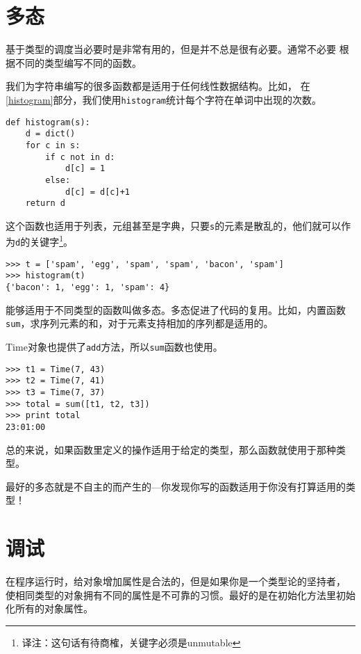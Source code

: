 \section{多态}

基于类型的调度当必要时是非常有用的，但是并不总是很有必要。通常不必要
根据不同的类型编写不同的函数。


我们为字符串编写的很多函数都是适用于任何线性数据结构。比如，
在\ref{histogram}部分，我们使用{\tt histogram}统计每个字符在单词中出现的次数。

\beforeverb
\begin{verbatim}
def histogram(s):
    d = dict()
    for c in s:
        if c not in d:
            d[c] = 1
        else:
            d[c] = d[c]+1
    return d
\end{verbatim}
\afterverb

这个函数也适用于列表，元组甚至是字典，只要{\tt s}的元素是散乱的，他们就可以作为{\tt d}的关键字\footnote{译注：这句话有待商榷，关键字必须是unmutable}。

\beforeverb
\begin{verbatim}
>>> t = ['spam', 'egg', 'spam', 'spam', 'bacon', 'spam']
>>> histogram(t)
{'bacon': 1, 'egg': 1, 'spam': 4}
\end{verbatim}
\afterverb

能够适用于不同类型的函数叫做多态。多态促进了代码的复用。比如，内置函数{\tt sum}，求序列元素的和，对于元素支持相加的序列都是适用的。


Time对象也提供了{\tt add}方法，所以{\tt sum}函数也使用。

\beforeverb
\begin{verbatim}
>>> t1 = Time(7, 43)
>>> t2 = Time(7, 41)
>>> t3 = Time(7, 37)
>>> total = sum([t1, t2, t3])
>>> print total
23:01:00
\end{verbatim}
\afterverb

总的来说，如果函数里定义的操作适用于给定的类型，那么函数就使用于那种类型。

最好的多态就是不自主的而产生的---你发现你写的函数适用于你没有打算适用的类型！

\section{调试}

在程序运行时，给对象增加属性是合法的，但是如果你是一个类型论的坚持者，
使相同类型的对象拥有不同的属性是不可靠的习惯。最好的是在初始化方法里初始化所有的对象属性。

